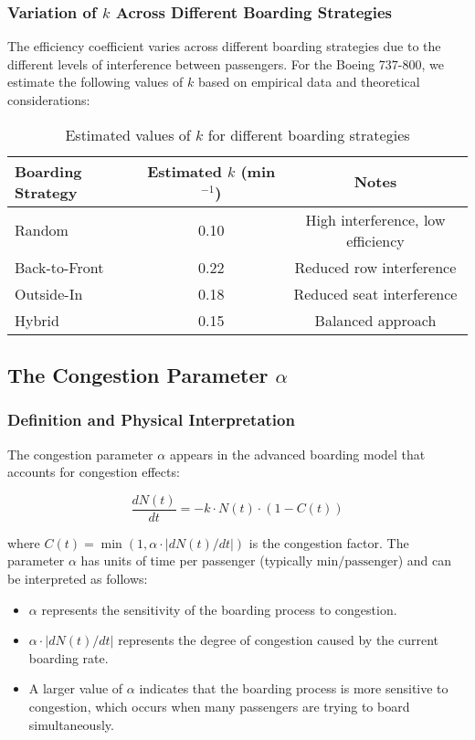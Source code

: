 \documentclass[12pt,a4paper]{article}
\begin{document}
\subsubsection{Variation of $k$ Across Different Boarding Strategies}

The efficiency coefficient varies across different boarding strategies due to the different levels of interference between passengers. For the Boeing 737-800, we estimate the following values of $k$ based on empirical data and theoretical considerations:

\begin{table}[H]
\centering
\begin{tabular}{|l|c|c|}
\hline
\textbf{Boarding Strategy} & \textbf{Estimated $k$ (min$^{-1}$)} & \textbf{Notes} \\ \hline
Random & 0.10 & High interference, low efficiency \\ \hline
Back-to-Front & 0.22 & Reduced row interference \\ \hline
Outside-In & 0.18 & Reduced seat interference \\ \hline
Hybrid & 0.15 & Balanced approach \\ \hline
\end{tabular}
\caption{Estimated values of $k$ for different boarding strategies}
\label{tab:k_values}
\end{table}

\subsection{The Congestion Parameter $\alpha$}

\subsubsection{Definition and Physical Interpretation}

The congestion parameter $\alpha$ appears in the advanced boarding model that accounts for congestion effects:

\begin{equation}
\frac{dN(t)}{dt} = -k \cdot N(t) \cdot (1 - C(t))
\end{equation}

where $C(t) = \min(1, \alpha \cdot |dN(t)/dt|)$ is the congestion factor. The parameter $\alpha$ has units of time per passenger (typically $\text{min/passenger}$) and can be interpreted as follows:

\begin{itemize}
    \item $\alpha$ represents the sensitivity of the boarding process to congestion.
    \item $\alpha \cdot |dN(t)/dt|$ represents the degree of congestion caused by the current boarding rate.
    \item A larger value of $\alpha$ indicates that the boarding process is more sensitive to congestion, which occurs when many passengers are trying to board simultaneously.
\end{itemize}
\end{document}
